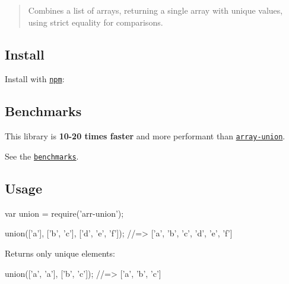 \begin{quote}
Combines a list of arrays, returning a single array with unique values, using strict equality for comparisons. \end{quote}


\subsection*{Install}

Install with \href{https://www.npmjs.com/}{\tt npm}\+:




\subsection*{Benchmarks}

This library is {\bfseries 10-\/20 times faster} and more performant than \href{https://github.com/sindresorhus/array-union}{\tt array-\/union}.

See the \href{./benchmark}{\tt benchmarks}.




\subsection*{Usage}


\begin{DoxyCode}
var union = require('arr-union');

union(['a'], ['b', 'c'], ['d', 'e', 'f']);
//=> ['a', 'b', 'c', 'd', 'e', 'f']
\end{DoxyCode}


Returns only unique elements\+:


\begin{DoxyCode}
union(['a', 'a'], ['b', 'c']);
//=> ['a', 'b', 'c']
\end{DoxyCode}


